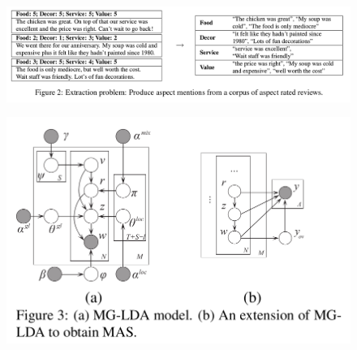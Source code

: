 \documentclass[xcolor={table}]{beamer}
\begin{document}
\begin{frame}{\cite{titov2008joint}}
\begin{figure}[h]
\centering
\includegraphics[scale=.2]{images/figure2-titov08} \\
\end{figure}
\end{frame}

\begin{frame}{\cite{titov2008joint}}
\begin{figure}[h]
\centering
\includegraphics[scale=.3]{images/figure3-titov08} \\
\end{figure}
\end{frame}
\end{document}
